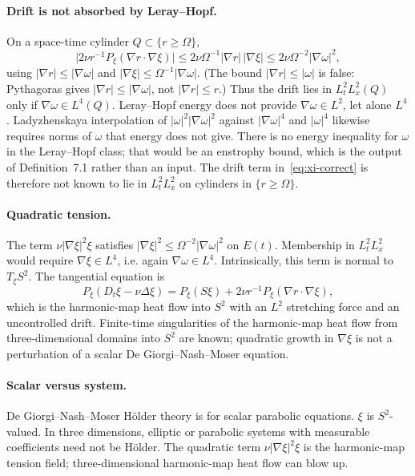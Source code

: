 \documentclass[11pt,a4paper]{article}
\theoremstyle{definition}
\theoremstyle{remark}
\newcommand{\abs}[1]{\lvert#1\rvert}
\begin{document}
\paragraph{Drift is not absorbed by Leray--Hopf.}
On a space-time cylinder \(Q\subset\{r\ge\Omega\}\),
\[
\abs{2\nu r^{-1}P_\xi(\nabla r\cdot\nabla\xi)}
\le 2\nu\Omega^{-1}\abs{\nabla r}\,\abs{\nabla\xi}
\le 2\nu\Omega^{-2}\abs{\nabla\omega}^2,
\]
using \(\abs{\nabla r}\le\abs{\nabla\omega}\) and
\(\abs{\nabla\xi}\le\Omega^{-1}\abs{\nabla\omega}\). (The bound
\(\abs{\nabla r}\le\abs{\omega}\) is false: Pythagoras gives
\(\abs{\nabla r}\le\abs{\nabla\omega}\), not \(\abs{\nabla r}\le r\).)
Thus the drift lies in \(L^2_t L^2_x(Q)\) only if
\(\nabla\omega\in L^4(Q)\). Leray--Hopf energy does not provide
\(\nabla\omega\in L^2\), let alone \(L^4\). Ladyzhenskaya interpolation
of \(\abs{\omega}^2\abs{\nabla\omega}^2\) against \(\abs{\nabla\omega}^4\)
and \(\abs{\omega}^4\) likewise requires norms of \(\omega\) that energy
does not give. There is no energy inequality for \(\omega\) in the
Leray--Hopf class; that would be an enstrophy bound, which is the
output of Definition~7.1 rather than an input. The drift term in~\eqref{eq:xi-correct}
is therefore not known to lie in \(L^2_t L^2_x\) on cylinders in
\(\{r\ge\Omega\}\).

\paragraph{Quadratic tension.}
The term \(\nu\abs{\nabla\xi}^2\xi\) satisfies
\(\abs{\nabla\xi}^2\le\Omega^{-2}\abs{\nabla\omega}^2\) on \(E(t)\).
Membership in \(L^2_t L^2_x\) would require \(\nabla\xi\in L^4\), i.e.
again \(\nabla\omega\in L^4\). Intrinsically, this term is normal to
\(T_\xi S^2\). The tangential equation is
\begin{equation}
\label{eq:xi-tangential}
P_\xi(D_t\xi-\nu\Delta\xi)
=P_\xi(S\xi)+2\nu r^{-1}P_\xi(\nabla r\cdot\nabla\xi),
\end{equation}
which is the harmonic-map heat flow into \(S^2\) with an \(L^2\) stretching
force and an uncontrolled drift. Finite-time singularities of the
harmonic-map heat flow from three-dimensional domains into \(S^2\) are
known; quadratic growth in \(\nabla\xi\) is not a perturbation of a
scalar De Giorgi--Nash--Moser equation.

\paragraph{Scalar versus system.}
De Giorgi--Nash--Moser H\"older theory is for scalar parabolic equations.
\(\xi\) is \(S^2\)-valued. In three dimensions, elliptic or parabolic
systems with measurable coefficients need not be H\"older. The quadratic
term \(\nu\abs{\nabla\xi}^2\xi\) is the harmonic-map tension field;
three-dimensional harmonic-map heat flow can blow up.
\end{document}
